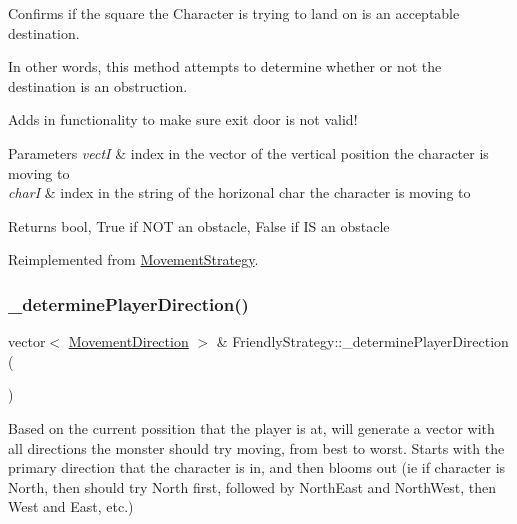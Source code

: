 Confirms if the square the Character is trying to land on is an acceptable destination. 

In other words, this method attempts to determine whether or not the destination is an obstruction. 

Adds in functionality to make sure exit door is not valid! 
\begin{DoxyParams}{Parameters}
{\em vectI} & index in the vector of the vertical position the character is moving to \\
\hline
{\em charI} & index in the string of the horizonal char the character is moving to \\
\hline
\end{DoxyParams}
\begin{DoxyReturn}{Returns}
bool, True if N\+OT an obstacle, False if IS an obstacle 
\end{DoxyReturn}


Reimplemented from \hyperlink{class_movement_strategy_a7767e4732545752f69dab06fe478152c}{Movement\+Strategy}.

\hypertarget{class_friendly_strategy_a83e515ba2c3a8d9895f2bdde08091b1d}{}\label{class_friendly_strategy_a83e515ba2c3a8d9895f2bdde08091b1d} 
\subsubsection{\texorpdfstring{\+\_\+determine\+Player\+Direction()}{\_determinePlayerDirection()}}
{\footnotesize\ttfamily vector$<$ \hyperlink{_movement_strategy_8h_a0b5e764f0ec9a407e9b8789f0259d754}{Movement\+Direction} $>$ \& Friendly\+Strategy\+::\+\_\+determine\+Player\+Direction (\begin{DoxyParamCaption}{ }\end{DoxyParamCaption})\hspace{0.3cm}{\ttfamily [protected]}}

Based on the current possition that the player is at, will generate a vector with all directions the monster should try moving, from best to worst. Starts with the \textquotesingle{}primary\textquotesingle{} direction that the character is in, and then blooms out (ie if character is North, then should try North first, followed by North\+East and North\+West, then West and East, etc.) \hypertarget{class_friendly_strategy_ac1f5837825bf7090d31c06f88f463e35}{}\label{class_friendly_strategy_ac1f5837825bf7090d31c06f88f463e35} 
